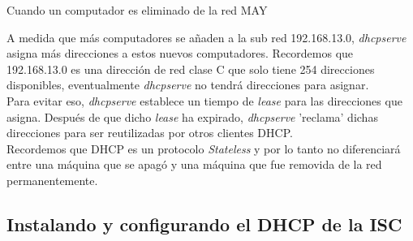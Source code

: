 \begin{frame}[fragile]{Cuando un computador es eliminado de la red MAY}

   A medida que más computadores se añaden a la sub red 192.168.13.0,
   \textit{dhcpserve} asigna más direcciones a estos nuevos computadores.
   Recordemos que 192.168.13.0 es una dirección de red clase C que solo tiene
   254 direcciones disponibles, eventualmente \textit{dhcpserve} no tendrá
   direcciones para asignar.\\[0.2cm]

   Para evitar eso, \textit{dhcpserve} establece un tiempo de \textit{lease}
   para las direcciones que asigna. Después de que dicho \textit{lease} ha
   expirado, \textit{dhcpserve} 'reclama' dichas direcciones para ser
   reutilizadas por otros clientes DHCP.\\[0.2cm]

   Recordemos que DHCP es un protocolo \textit{Stateless} y por lo tanto no
   diferenciará entre una máquina que se apagó y una máquina que fue removida
   de la red permanentemente.\\[0.2cm]

\end{frame}

\subsection{Instalando y configurando el DHCP de la ISC} %
\label{sub:Instalando y configurando el DHCP de la ISC}


